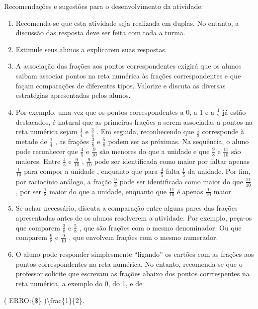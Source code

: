 \documentclass[a4,12pt]{book}
\newcounter{atividade}
\begin{document}
Recomendações e sugestões para o desenvolvimento da atividade:
\begin{enumerate} [\quad a)] %
  \item     Recomenda-se que esta atividade seja realizada em duplas. No entanto, a discussão das resposta deve ser feita com toda a turma.
  \item     Estimule seus alunos a explicarem suas respostas.
  \item     A associação das frações aos pontos correspondentes exigirá que os alunos saibam associar pontos na reta numérica às frações correspondentes e que façam comparações de diferentes tipos. Valorize e discuta as diversas estratégias apresentadas pelos alunos.
  \item     Por exemplo, uma vez que os pontos correspondentes a 0, a 1 e a     $\frac{1}{2}$     já estão destacados, é natural que as primeiras frações a serem associadas a pontos na reta numérica sejam     $\frac{1}{4}$     e     $\frac{3}{4}$    . Em seguida, reconhecendo que     $\frac{1}{8}$     corresponde à metade de     $\frac{1}{4}$    ,  as frações     $\frac{3}{8}$     e     $\frac{5}{8}$     podem ser as próximas.  Na sequência, o aluno pode reconhecer que     $\frac{4}{5}$     e     $\frac{9}{10}$     são menores do que a unidade e que     $\frac{9}{8}$     e     $\frac{11}{10}$     são maiores.  Entre     $\frac{4}{5}$     e     $\frac{9}{10}$    ,     $\frac{9}{10}$     pode ser identificada como maior por faltar  apenas     $\frac{1}{10}$     para compor a unidade , enquanto que para     $\frac{4}{5}$     falta     $\frac{1}{5}$     da unidade. Por fim, por raciocínio análogo, a fração     $\frac{9}{8}$     pode ser identificada como maior do que     $\frac{11}{10}$    , por ser     $\frac{1}{8}$     maior do que a unidade, enquanto que     $\frac{11}{10}$     é apenas     $\frac{1}{10}$     maior.
  \item     Se achar necessário, discuta a comparação entre alguns pares das frações apresentadas antes de os alunos resolverem a atividade. Por exemplo, peça-os que comparem     $\frac{3}{8}$      e     $\frac{5}{8}$    , que são frações com o mesmo denominador. Ou que comparem     $\frac{9}{8}$     e     $\frac{9}{10}$    , que envolvem frações com o mesmo numerador.
  \item     O aluno pode responder simplesmente     ``ligando''     os cartões com as frações aos pontos correspondentes na reta numérica. No entanto, recomenda-se que o professor solicite que escrevam as frações abaixo dos pontos corrrespentes na reta numérica, a exemplo do 0, do 1, e de
\end{enumerate} %
( ERRO:\{\$\} )\textbackslash{}frac\{1\}\{2\}.
\end{document}
